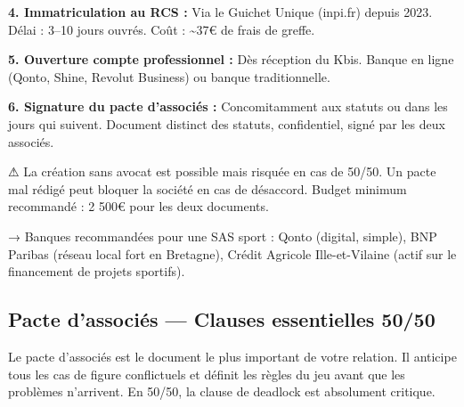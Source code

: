 \documentclass[11pt, a4paper]{article}
\begin{document}
\textbf{4. Immatriculation au RCS :} Via le Guichet Unique (inpi.fr) depuis 2023. Délai : 3–10 jours ouvrés. Coût : \textasciitilde37€ de frais de greffe.

\textbf{5. Ouverture compte professionnel :} Dès réception du Kbis. Banque en ligne (Qonto, Shine, Revolut Business) ou banque traditionnelle.

\textbf{6. Signature du pacte d'associés :} Concomitamment aux statuts ou dans les jours qui suivent. Document distinct des statuts, confidentiel, signé par les deux associés.

\begin{warnbox}
⚠ La création sans avocat est possible mais risquée en cas de 50/50. Un pacte mal rédigé peut bloquer la société en cas de désaccord. Budget minimum recommandé : 2 500€ pour les deux documents.
\end{warnbox}

\begin{tipbox}
→ Banques recommandées pour une SAS sport : Qonto (digital, simple), BNP Paribas (réseau local fort en Bretagne), Crédit Agricole Ille-et-Vilaine (actif sur le financement de projets sportifs).
\end{tipbox}

\subsection{Pacte d'associés — Clauses essentielles 50/50}

Le pacte d'associés est le document le plus important de votre relation. Il anticipe tous les cas de figure conflictuels et définit les règles du jeu avant que les problèmes n'arrivent. En 50/50, la clause de deadlock est absolument critique.
\end{document}
